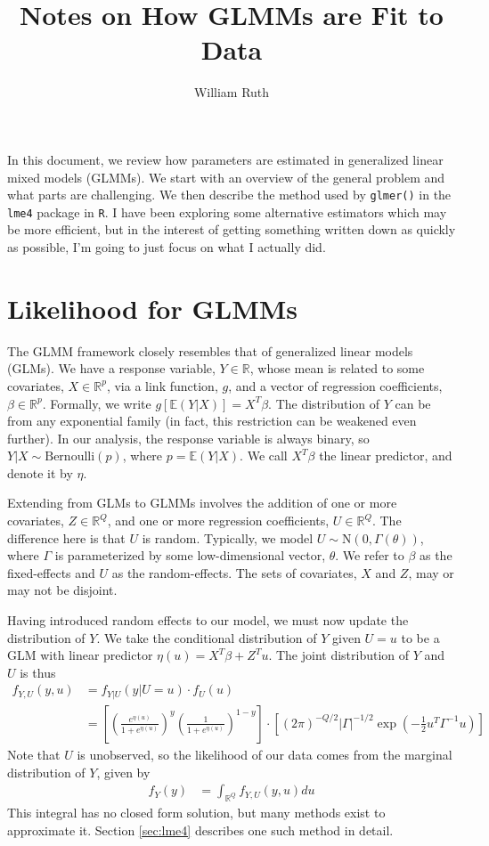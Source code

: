 \documentclass{article}
\title{Notes on How GLMMs are Fit to Data}
\author{William Ruth}
\date{}
\newcommand{\bE}{\mathbb{E}}
\newcommand{\bR}{\mathbb{R}}
\begin{document}
\maketitle

In this document, we review how parameters are estimated in generalized linear mixed models (GLMMs). We start with an overview of the general problem and what parts are challenging. We then describe the method used by \texttt{glmer()} in the \texttt{lme4} package in \texttt{R}. I have been exploring some alternative estimators which may be more efficient, but in the interest of getting something written down as quickly as possible, I'm going to just focus on what I actually did.

\section{Likelihood for GLMMs}

The GLMM framework closely resembles that of generalized linear models (GLMs). We have a response variable, $Y \in \bR$, whose mean is related to some covariates, $X \in \bR^p$, via a link function, $g$, and a vector of regression coefficients, $\beta \in \bR^p$. Formally, we write $g[\bE(Y|X)] = X^T \beta$. The distribution of $Y$ can be from any exponential family (in fact, this restriction can be weakened even further). In our analysis, the response variable is always binary, so $Y|X \sim \mathrm{Bernoulli}(p)$, where $p = \bE(Y|X)$. We call $X^T \beta$ the linear predictor, and denote it by $\eta$.

Extending from GLMs to GLMMs involves the addition of one or more covariates, $Z \in \bR^Q$, and one or more regression coefficients, $U \in \bR^Q$. The difference here is that $U$ is random. Typically, we model $U \sim \mathrm{N}(0, \Gamma(\theta))$, where $\Gamma$ is parameterized by some low-dimensional vector, $\theta$. We refer to $\beta$ as the fixed-effects and $U$ as the random-effects. The sets of covariates, $X$ and $Z$, may or may not be disjoint.

Having introduced random effects to our model, we must now update the distribution of $Y$. We take the conditional distribution of $Y$ given $U=u$ to be a GLM with linear predictor $\eta(u) = X^T \beta + Z^T u$. The joint distribution of $Y$ and $U$ is thus
%
\begin{align}
    f_{Y,U}(y, u) &= f_{Y|U}(y | U=u) \cdot f_U(u)\\
    &= \left[ \left( \frac{e^{\eta(u)}}{1 + e^{\eta(u)}} \right)^y \left( \frac{1}{1 + e^{\eta(u)}} \right)^{1-y} \right] \cdot \left[ (2 \pi)^{-Q/2} |\Gamma|^{-1/2} \exp \left( - \frac{1}{2} u^T \Gamma^{-1} u \right)\right] \label{eq:fyu}
\end{align}
%
Note that $U$ is unobserved, so the likelihood of our data comes from the marginal distribution of $Y$, given by
%
\begin{align}
    f_Y(y) &= \int_{\bR^Q} f_{Y,U}(y,u) du \label{eq:fy_int}
\end{align}
%
This integral has no closed form solution, but many methods exist to approximate it. Section \ref{sec:lme4} describes one such method in detail.
\end{document}
